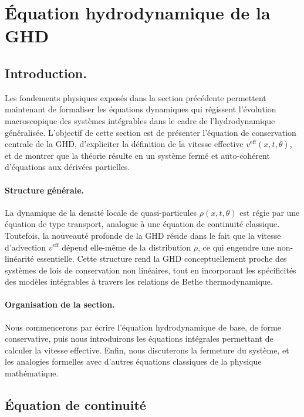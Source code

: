 \section{Équation hydrodynamique de la GHD}

\subsection*{Introduction.}
Les fondements physiques exposés dans la section précédente permettent maintenant de formaliser les équations dynamiques qui régissent l’évolution macroscopique des systèmes intégrables dans le cadre de l’hydrodynamique généralisée. L’objectif de cette section est de présenter l’équation de conservation centrale de la GHD, d’expliciter la définition de la vitesse effective $v^{\mathrm{eff}}(x,t,\theta)$, et de montrer que la théorie résulte en un système fermé et auto-cohérent d’équations aux dérivées partielles.

\paragraph{Structure générale.}
La dynamique de la densité locale de quasi-particules $\rho(x,t,\theta)$ est régie par une équation de type transport, analogue à une équation de continuité classique. Toutefois, la nouveauté profonde de la GHD réside dans le fait que la vitesse d’advection $v^{\mathrm{eff}}$ dépend elle-même de la distribution $\rho$, ce qui engendre une non-linéarité essentielle. Cette structure rend la GHD conceptuellement proche des systèmes de lois de conservation non linéaires, tout en incorporant les spécificités des modèles intégrables à travers les relations de Bethe thermodynamique.

\paragraph{Organisation de la section.}
Nous commencerons par écrire l’équation hydrodynamique de base, de forme conservative, puis nous introduirons les équations intégrales permettant de calculer la vitesse effective. Enfin, nous discuterons la fermeture du système, et les analogies formelles avec d'autres équations classiques de la physique mathématique.


\subsection{Équation de continuité}

